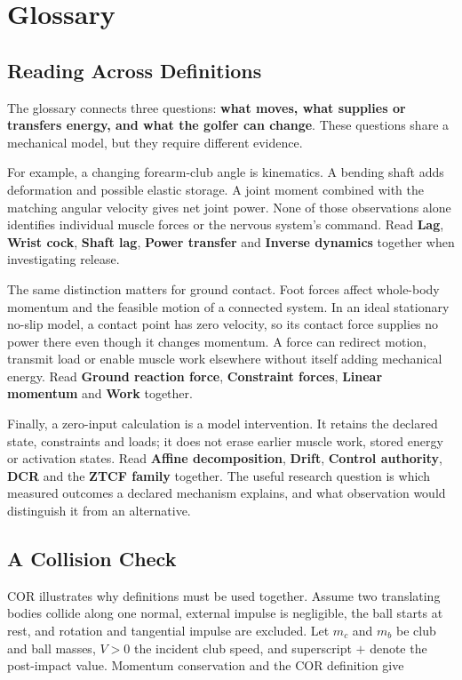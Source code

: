 \chapter*{Glossary}
\begingroup
\setlength{\emergencystretch}{2em}
\section*{Reading Across Definitions}

The glossary connects three questions: \textbf{what moves, what supplies or transfers energy, and what the golfer can change}. These questions share a mechanical model, but they require different evidence.

For example, a changing forearm-club angle is kinematics. A bending shaft adds deformation and possible elastic storage. A joint moment combined with the matching angular velocity gives net joint power. None of those observations alone identifies individual muscle forces or the nervous system's command. Read \textbf{Lag}, \textbf{Wrist cock}, \textbf{Shaft lag}, \textbf{Power transfer} and \textbf{Inverse dynamics} together when investigating release.

The same distinction matters for ground contact. Foot forces affect whole-body momentum and the feasible motion of a connected system. In an ideal stationary no-slip model, a contact point has zero velocity, so its contact force supplies no power there even though it changes momentum. A force can redirect motion, transmit load or enable muscle work elsewhere without itself adding mechanical energy. Read \textbf{Ground reaction force}, \textbf{Constraint forces}, \textbf{Linear momentum} and \textbf{Work} together.

Finally, a zero-input calculation is a model intervention. It retains the declared state, constraints and loads; it does not erase earlier muscle work, stored energy or activation states. Read \textbf{Affine decomposition}, \textbf{Drift}, \textbf{Control authority}, \textbf{DCR} and the \textbf{ZTCF family} together. The useful research question is which measured outcomes a declared mechanism explains, and what observation would distinguish it from an alternative.

\section*{A Collision Check}

COR illustrates why definitions must be used together. Assume two translating bodies collide along one normal, external impulse is negligible, the ball starts at rest, and rotation and tangential impulse are excluded. Let $m_c$ and $m_b$ be club and ball masses, $V>0$ the incident club speed, and superscript $+$ denote the post-impact value. Momentum conservation and the COR definition give

